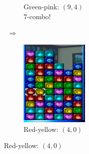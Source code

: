 \documentclass[10pt, final]{article}
\begin{document}
\begin{figure}[h!]
{\begin{subfigure}[h]{1.3in}
\caption*{Green-pink: $(9,4)$ \\ $7$-combo!}
\end{subfigure}
~$\mathbf{\Longrightarrow}$~
\begin{subfigure}[h]{1.3in}
\includegraphics[width=1.3in]{inspirational8.png}
\caption*{Red-yellow: $(4,0)$}
\end{subfigure}}\end{figure}
\end{document}

